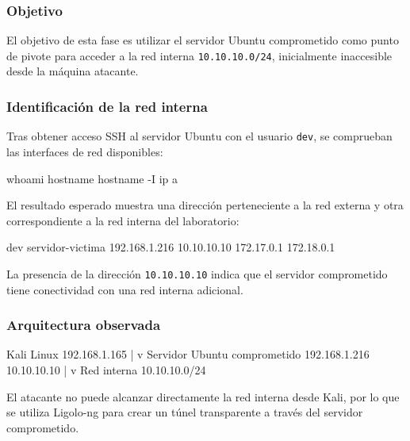 

\subsubsection*{Objetivo}

El objetivo de esta fase es utilizar el servidor Ubuntu comprometido como punto de pivote para acceder a la red interna \texttt{10.10.10.0/24}, inicialmente inaccesible desde la máquina atacante.

\subsubsection*{Identificación de la red interna}

Tras obtener acceso SSH al servidor Ubuntu con el usuario \texttt{dev}, se comprueban las interfaces de red disponibles:

\begin{bashbox}
whoami
hostname
hostname -I
ip a
\end{bashbox}

El resultado esperado muestra una dirección perteneciente a la red externa y otra correspondiente a la red interna del laboratorio:

\begin{configbox}
dev
servidor-victima
192.168.1.216 10.10.10.10 172.17.0.1 172.18.0.1
\end{configbox}

La presencia de la dirección \texttt{10.10.10.10} indica que el servidor comprometido tiene conectividad con una red interna adicional.

\subsubsection*{Arquitectura observada}

\begin{configbox}
Kali Linux
192.168.1.165
       |
       v
Servidor Ubuntu comprometido
192.168.1.216
10.10.10.10
       |
       v
Red interna
10.10.10.0/24
\end{configbox}

El atacante no puede alcanzar directamente la red interna desde Kali, por lo que se utiliza Ligolo-ng para crear un túnel transparente a través del servidor comprometido.

